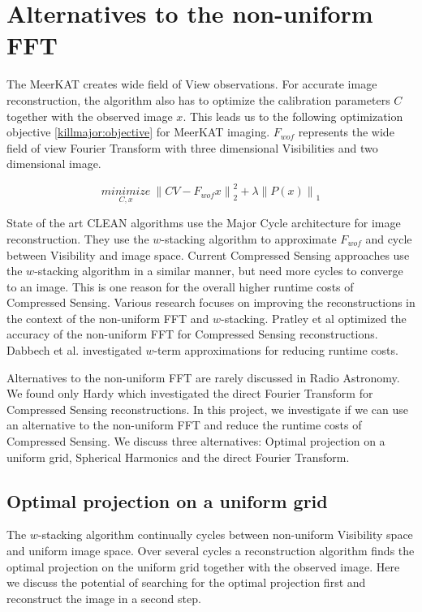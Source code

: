 \section{Alternatives to the non-uniform FFT}\label{killmajor}
The MeerKAT creates wide field of View observations. For accurate image reconstruction, the algorithm also has to optimize the calibration parameters $C$ together with the observed image $x$. This leads us to the following optimization objective \eqref{killmajor:objective} for MeerKAT imaging. $F_{wof}$ represents the wide field of view Fourier Transform with three dimensional Visibilities and two dimensional image. 

\begin{equation}\label{killmajor:objective}
\underset{C, x}{minimize} \: \left \| CV - F_{wof}x \right \|_2^2 + \lambda \left \| P(x) \right \|_1
\end{equation}

State of the art CLEAN algorithms use the Major Cycle architecture for image reconstruction. They use the $w$-stacking algorithm to approximate $F_{wof}$ and cycle between Visibility and image space. Current Compressed Sensing approaches use the $w$-stacking algorithm in a similar manner\cite{girard2015sparse, dabbech2018cygnus, mcewen2011compressed, pratley2018fast}, but need more cycles to converge to an image. This is one reason for the overall higher runtime costs of Compressed Sensing. Various research focuses on improving the reconstructions in the context of the non-uniform FFT and $w$-stacking. Pratley et al\cite{pratley2017robust} optimized the accuracy of the non-uniform FFT for Compressed Sensing reconstructions. Dabbech et al.\cite{dabbech2017wEffect} investigated $w$-term approximations for reducing runtime costs. 

Alternatives to the non-uniform FFT are rarely discussed in Radio Astronomy. We found only Hardy\cite{hardy2013direct} which investigated the direct Fourier Transform for Compressed Sensing reconstructions. In this project, we investigate if we can use an alternative to the non-uniform FFT and reduce the runtime costs of Compressed Sensing. We discuss three alternatives: Optimal projection on a uniform grid, Spherical Harmonics and the direct Fourier Transform.

\subsection{Optimal projection on a uniform grid}
The $w$-stacking algorithm continually cycles between non-uniform Visibility space and uniform image space. Over several cycles a reconstruction algorithm finds the optimal projection on the uniform grid together with the observed image. Here we discuss the potential of searching for the optimal projection first and reconstruct the image in a second step.


